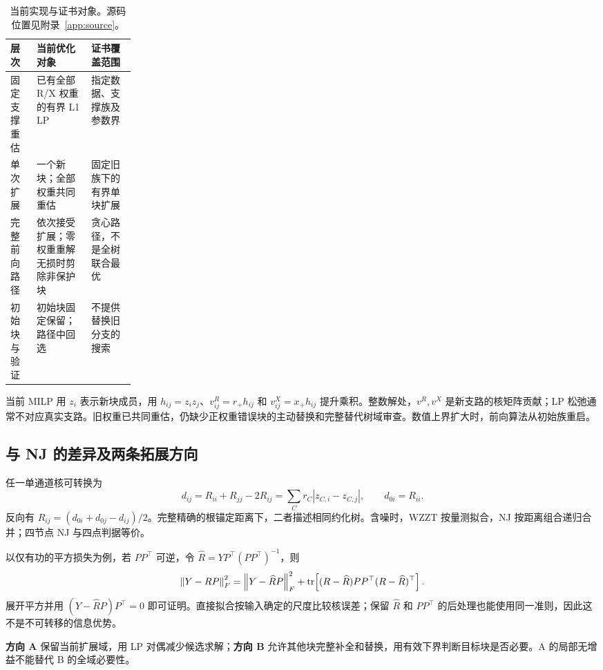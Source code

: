\begin{table}[htbp]
\centering\small
\begin{tabularx}{\linewidth}{@{}p{0.21\linewidth}XX@{}}
\toprule
层次 & 当前优化对象 & 证书覆盖范围\\
\midrule
固定支撑重估 & 已有全部 R/X 权重的有界 L1 LP & 指定数据、支撑族及参数界\\
单次扩展 & 一个新块；全部权重共同重估 & 固定旧族下的有界单块扩展\\
完整前向路径 & 依次接受扩展；零权重重解无损时剪除非保护块 & 贪心路径，不是全树联合最优\\
初始块与验证 & 初始块固定保留；路径中回选 & 不提供替换旧分支的搜索\\
\bottomrule
\end{tabularx}
\caption{当前实现与证书对象。源码位置见附录~\ref{app:source}。}
\end{table}

当前 MILP 用 $z_i$ 表示新块成员，用 $h_{ij}=z_i z_j$、$v^R_{ij}=r_+h_{ij}$ 和 $v^X_{ij}=x_+h_{ij}$ 提升乘积。整数解处，$v^R,v^X$ 是新支路的核矩阵贡献；LP 松弛通常不对应真实支路。旧权重已共同重估，仍缺少正权重错误块的主动替换和完整替代树域审查。数值上界扩大时，前向算法从初始族重启。

\subsection{与 NJ 的差异及两条拓展方向}
任一单通道核可转换为
\begin{equation}
 d_{ij}=R_{ii}+R_{jj}-2R_{ij}
 =\sum_Cr_C|z_{C,i}-z_{C,j}|,\qquad d_{0i}=R_{ii}.
 \label{eq:kernelmetric}
\end{equation}
反向有 $R_{ij}=(d_{0i}+d_{0j}-d_{ij})/2$。完整精确的根锚定距离下，二者描述相同约化树。含噪时，WZZT 按量测拟合，NJ 按距离组合递归合并；四节点 NJ 与四点判据等价\citep[\S3, Proposition~6]{mihaescu2007}。

以仅有功的平方损失为例，若 $PP^\top$ 可逆，令 $\widehat R=YP^\top(PP^\top)^{-1}$，则
\begin{equation}
 \left\lVert Y-RP\right\rVert_F^2=\left\lVert Y-\widehat RP\right\rVert_F^2+
 \operatorname{tr}\!\left[(R-\widehat R)PP^\top(R-\widehat R)^\top\right].
 \label{eq:inputmetric}
\end{equation}
展开平方并用 $(Y-\widehat RP)P^\top=0$ 即可证明。直接拟合按输入确定的尺度比较核误差；保留 $\widehat R$ 和 $PP^\top$ 的后处理也能使用同一准则，因此这不是不可转移的信息优势。

\textbf{方向 A} 保留当前扩展域，用 LP 对偶减少候选求解；\textbf{方向 B} 允许其他块完整补全和替换，用有效下界判断目标块是否必要。A 的局部无增益不能替代 B 的全域必要性。

